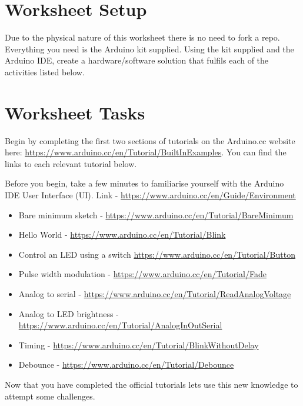 \documentclass{../../fal_assignment}
\begin{document}
\section*{Worksheet Setup}

Due to the physical nature of this worksheet there is no need to fork a repo. Everything you need is the Arduino kit supplied. Using the kit supplied and the Arduino IDE, create a hardware/software solution that fulfils each of the activities listed below. 

\section*{Worksheet Tasks}

Begin by completing the first two sections of tutorials on the Arduino.cc website here: \url{https://www.arduino.cc/en/Tutorial/BuiltInExamples}. You can find the links to each relevant tutorial below. 

Before you begin, take a few minutes to familiarise yourself with the Arduino IDE User Interface (UI).
Link - \url{https://www.arduino.cc/en/Guide/Environment}

\begin{itemize}
	\item Bare minimum sketch - \url{https://www.arduino.cc/en/Tutorial/BareMinimum}
	\item Hello World - \url{https://www.arduino.cc/en/Tutorial/Blink}
	\item Control an LED using a switch \url{https://www.arduino.cc/en/Tutorial/Button}
	\item Pulse width modulation - \url{https://www.arduino.cc/en/Tutorial/Fade}
	\item Analog to serial - \url{https://www.arduino.cc/en/Tutorial/ReadAnalogVoltage}
	\item Analog to LED brightness - \url{https://www.arduino.cc/en/Tutorial/AnalogInOutSerial}
	\item Timing - \url{https://www.arduino.cc/en/Tutorial/BlinkWithoutDelay}
	\item Debounce - \url{https://www.arduino.cc/en/Tutorial/Debounce}
\end{itemize}	

Now that you have completed the official tutorials lets use this new knowledge to attempt some challenges. 
\end{document}
